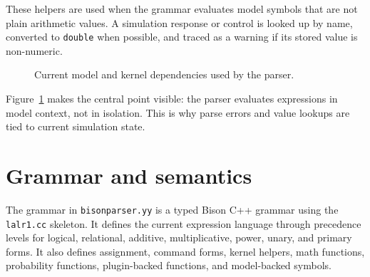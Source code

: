 These helpers are used when the grammar evaluates model symbols that are not
plain arithmetic values. A simulation response or control is looked up by
name, converted to \texttt{double} when possible, and traced as a warning if
its stored value is non-numeric.

\begin{figure}[htbp]
\centering
\caption{Current model and kernel dependencies used by the parser.}
\label{fig:parser-model-dependency}
\end{figure}

Figure~\ref{fig:parser-model-dependency} makes the central point visible:
the parser evaluates expressions in model context, not in isolation. This is
why parse errors and value lookups are tied to current simulation state.

\section{Grammar and semantics}
\label{sec:parser-grammar-semantics}

The grammar in \texttt{bisonparser.yy} is a typed Bison C++ grammar using the
\texttt{lalr1.cc} skeleton. It defines the current expression language through
precedence levels for logical, relational, additive, multiplicative, power,
unary, and primary forms. It also defines assignment, command forms, kernel
helpers, math functions, probability functions, plugin-backed functions, and
model-backed symbols.

